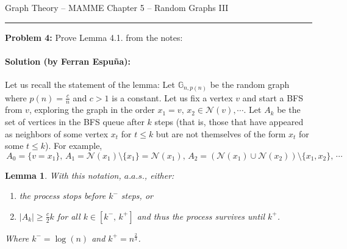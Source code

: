 \documentclass{amsart}
\theoremstyle{plain}
\newtheorem*{lemma}{\textbf{Lemma}}
\theoremstyle{definition}
\begin{document}
    {\Large Graph Theory -- MAMME}
    {\Large Chapter 5 -- Random Graphs III}

    \vspace{0.5cm}

    \hrule

    \vspace{0.5cm}

    \noindent \textbf{Problem 4:}
    Prove Lemma 4.1. from the notes:


    \paragraph{\textbf{Solution (by Ferran Espuña):}}
    Let us recall the statement of the lemma:
    Let $\mathbb{G}_{n,p(n)}$ be the random graph where $p(n) = \frac{c}{n}$ and $c > 1$ is a constant.
    Let us fix a vertex $v$ and start a BFS from $v$, exploring the graph in the order
    $x_1 = v,\, x_2 \in \mathcal{N}(v), \cdots$.
    Let $A_k$ be the set of vertices in the BFS queue after $k$ steps (that is, those that have appeared
    as neighbors of some vertex $x_t$ for $t \leq k$ but are not themselves of the form $x_t$ for some $t \leq k$).
    For example,$
    \, A_0 = \{ v = x_1 \}, \,
    A_1 = \mathcal{N}(x_1) \setminus \{x_1\} = \mathcal{N}(x_1), \,
    A_2 = (\mathcal{N}(x_1) \cup \mathcal{N}(x_2)) \setminus \{x_1, x_2\}, \, \cdots$

    \begin{lemma}
        With this notation, $a.a.s.$, either:
        \begin{enumerate}
            \item the process stops before $k^-$ steps, or \label{itm:1}
            \item $|A_k| \geq \frac{c}{2}k$ for all $k \in [k^{-}, \, k^{+}]$
            and thus the process survives until $k^{+}$. \label{itm:2}
        \end{enumerate}
        Where $k^{-} = \log(n)$ and $k^{+} = n^{\frac{2}{3}}$.
    \end{lemma}
\end{document}
